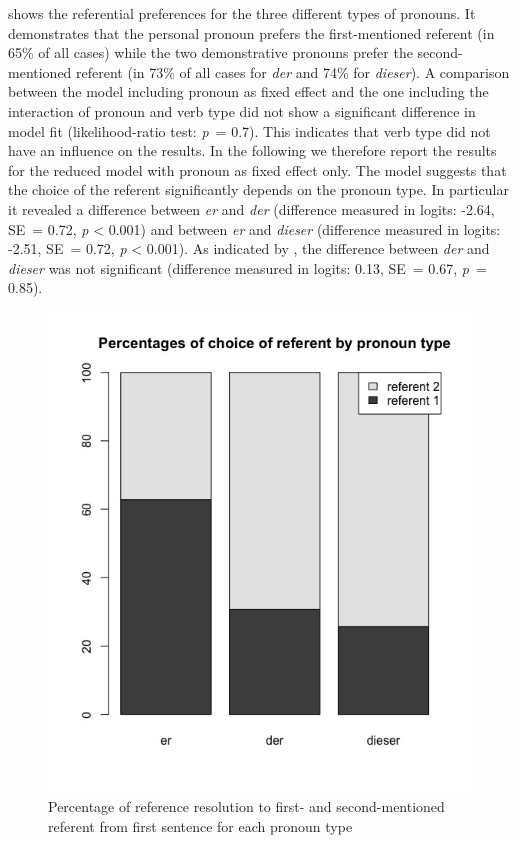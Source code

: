 \documentclass[output=paper,colorlinks,citecolor=brown]{langscibook}
\begin{document}
 shows the referential preferences for the three different types of pronouns. It demonstrates that the personal pronoun prefers the first-mentioned referent (in 65\% of all cases) while the two demonstrative pronouns prefer the second-mentioned referent (in 73\% of all cases for \textit{der} and 74\% for \textit{dieser}). A comparison between the model including pronoun as fixed effect and the one including the interaction of pronoun and verb type did not show a significant difference in model fit (likelihood-ratio test: \textit{p}~= 0.7). This indicates that verb type did not have an influence on the results. In the following we therefore report the results for the reduced model with pronoun as fixed effect only. The model suggests that the choice of the referent significantly depends on the pronoun type. In particular it revealed a difference between \textit{er} and \textit{der} (difference measured in logits: -2.64, SE~= 0.72, \textit{p} < 0.001) and between \textit{er} and \textit{dieser} (difference measured in logits: -2.51, SE~= 0.72, \textit{p} < 0.001). As indicated by , the difference between \textit{der} and \textit{dieser} was not significant (difference measured in logits: 0.13, SE~= 0.67, \textit{p}~= 0.85). 

\begin{figure}
\includegraphics[height=.6\textheight]{figures/a8FuchsSchumacher20200420-img001.jpg} \caption{Percentage of reference resolution to first- and second-mentioned referent from first sentence for each pronoun type}
\label{fig:fuchs:1}
\end{figure}
\end{document}

